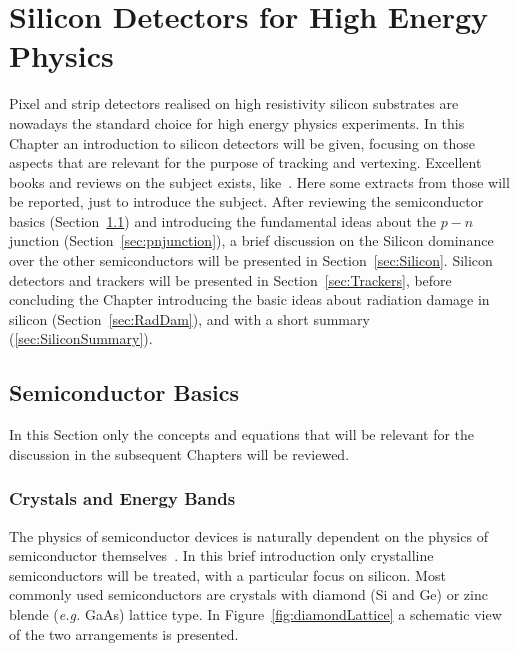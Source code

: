 \chapter{Silicon Detectors for High Energy Physics}
\label{chap:silicon}

Pixel and strip detectors realised on high resistivity silicon substrates are nowadays the standard 
choice for high energy physics experiments. 
In this Chapter an introduction to silicon detectors will be given, focusing 
on those aspects that are relevant for the purpose of tracking and vertexing.
Excellent books and reviews on the subject exists, like~\cite{Lutz:411172,Sze1981,Wang1989,Krammer,Shockley,rossi2006pixel,Hartmann2012,Garcia-Sciveres:2017ymt}. 
Here some extracts from those will be reported, just to introduce the subject. 
After reviewing the semiconductor basics (Section~\ref{sec:SCBase}) and introducing 
the fundamental ideas about the $p-n$ junction (Section~\ref{sec:pnjunction}), a brief discussion on 
the Silicon dominance over the other semiconductors will be presented in Section~\ref{sec:Silicon}. 
Silicon detectors and trackers will be presented in Section~\ref{sec:Trackers}, before concluding 
the Chapter introducing the basic ideas about radiation 
damage in silicon (Section~\ref{sec:RadDam}), and with a short summary (\ref{sec:SiliconSummary}).
 
\section{Semiconductor Basics}
\label{sec:SCBase}
In this Section only the concepts and equations that will be relevant for the discussion in the subsequent 
Chapters will be reviewed. 
\subsection{Crystals and Energy Bands}

The physics of semiconductor devices is naturally dependent on the physics of semiconductor 
themselves~\cite{Sze1981}. In this brief introduction only crystalline semiconductors will be treated, 
with a particular focus on silicon. Most commonly used semiconductors are crystals with 
diamond (Si and Ge) or zinc blende ({\it e.g.} GaAs) lattice type. In Figure~\ref{fig:diamondLattice} 
a schematic view of the two arrangements is presented. 



